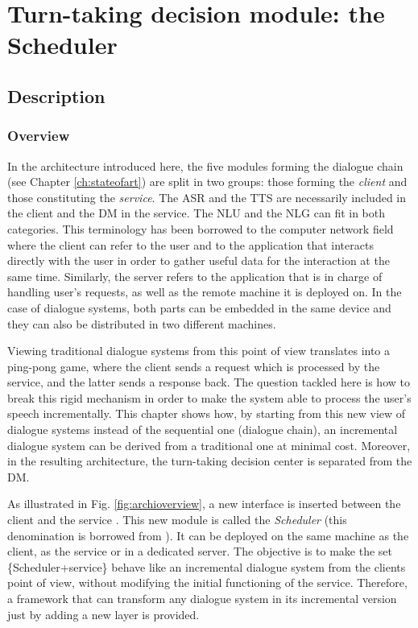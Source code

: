 \chapter{Turn-taking decision module: the Scheduler}

\label{ch:architecture}

\section{Description}
	\subsection{Overview}
    
    	In the architecture introduced here, the five modules forming the dialogue chain (see Chapter \ref{ch:stateofart}) are split in two groups: those forming the \textit{client} and those constituting the \textit{service}. The ASR and the TTS are necessarily included in the client and the  DM in the service. The NLU and the NLG can fit in both categories. This terminology has been borrowed to the computer network field where the client can refer to the user and to the application that interacts directly with the user in order to gather useful data for the interaction at the same time. Similarly, the server refers to the application that is in charge of handling user's requests, as well as the remote machine it is deployed on. In the case of dialogue systems, both parts can be embedded in the same device and they can also be distributed in two different machines.
        
        Viewing traditional dialogue systems from this point of view translates into a ping-pong game, where the client sends a request which is processed by the service, and the latter sends a response back. The question tackled here is how to break this rigid mechanism in order to make the system able to process the user's speech incrementally. This chapter shows how, by starting from this new view of dialogue systems instead of the sequential one (dialogue chain), an incremental dialogue system can be derived from a traditional one at minimal cost. Moreover, in the resulting architecture, the turn-taking decision center is separated from the DM.
        
        As illustrated in Fig. \ref{fig:archioverview}, a new interface is inserted between the client and the service \cite{Khouzaimi2014a}. This new module is called the \textit{Scheduler} (this denomination is borrowed from \cite{Laroche2010}). It can be deployed on the same machine as the client, as the service or in a dedicated server. The objective is to make the set \{Scheduler+service\} behave like an incremental dialogue system from the clients point of view, without modifying the initial functioning of the service. Therefore, a framework that can transform any dialogue system in its incremental version just by adding a new layer is provided.
        
